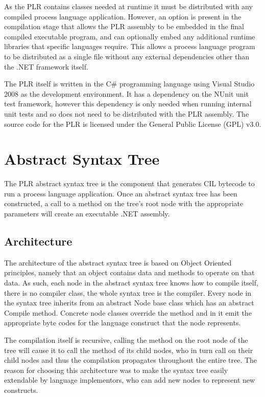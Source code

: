 	As the PLR contains classes needed at runtime it must be distributed with 
	any compiled process language application. However, an option is present in 
	the compilation stage that allows the PLR assembly to be embedded in the 
	final compiled executable program, and can optionally embed any additional 
	runtime libraries that specific languages require. This allows a process 
	language program to be distributed as a single file without any external 
	dependencies other than the .NET framework itself.

	The PLR itself is written in the C\# programming language using Visual 
	Studio 2008 as the development environment. It has a dependency on the NUnit 
	unit test framework, however this dependency is only needed when running 
	internal unit tests and so does not need to be distributed with the PLR 
	assembly. The source code for the PLR is licensed under the General Public 
	License (GPL) v3.0.
	
\section{Abstract Syntax Tree}

	The PLR abstract syntax tree is the component that generates CIL 
	bytecode to run a process language application. Once an abstract syntax tree 
	has been constructed, a call to a  method on the tree's root 
	node with the appropriate parameters will create an executable .NET 
	assembly. 

\subsection{Architecture}

	The architecture of the abstract syntax tree is based on Object Oriented 
	principles, namely that an object contains data and methods to operate on 
	that data. As such, each node in the abstract syntax tree knows how to 
	compile itself, there is no compiler class, the whole syntax tree is the 
	compiler. Every node in the syntax tree inherits from an abstract 
	\textsf{Node} base class which has an abstract \textsf{Compile} 
	method. Concrete node classes override the  method and in it 
	emit the appropriate byte codes for the language construct that the node 
	represents. 
	
	The compilation itself is recursive, calling the  method 
	on the root node of the tree will cause it to call the  
	method of its child nodes, who in turn call  on their child 
	nodes and thus the compilation propagates throughout the entire tree. The 
	reason for choosing this architecture was to make the syntax tree easily 
	extendable by language implementors, who can add new nodes to represent new 
	constructs. 
	
